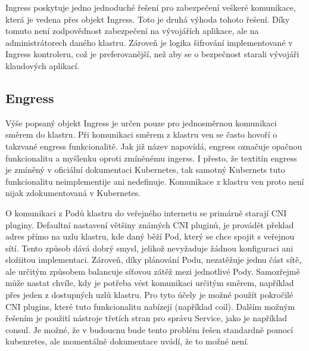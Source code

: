 Ingress poskytuje jedno jednoduché řešení pro zabezpečení veškeré komunikace, která je vedena přes objekt Ingress. Toto je druhá výhoda tohoto řešení. Díky tomuto není zodpovědnost zabezpečení na vývojářích aplikace, ale na administrátorech daného klastru. Zároveň je logika šifrování implementované v Ingress kontroleru, což je preferovanější, než aby se o bezpečnost starali vývojáři klaudových aplikací.\cite{koke_2023_bezpen}

\subsection{Engress}
Výše popsaný objekt Ingress je určen pouze pro jednosměrnou komunikaci směrem do klastru. Při komunikaci směrem z klastru ven se často hovoří o takzvané engress funkcionalitě. Jak již název napovídá, engress označuje opačnou funkcionalitu a myšlenku oproti zmíněnému ingerss. I přesto, že textitín engress je zmíněný v oficiální dokumentaci Kubernetes, tak samotný Kubernets tuto funkcionalitu neimplementije ani nedefinuje. Komunikace z klastru ven proto není nijak zdokumentovaná v Kubernetes.

O komunikaci z Podů klastru do veřejného internetu se primárně starají CNI pluginy. Defaultní nastavení většiny známých CNI pluginů, je provádět překlad adres přímo na uzlu klastru, kde daný běží Pod, který se chce spojit s veřejnou sítí. Tento způsob dává dobrý smysl, jelikož nevyžaduje žádnou konfiguraci ani složiitou implementaci. Zároveň, díky plánování Podu, nezatěžuje jednu část sítě, ale určitým způsobem balancuje síťovou zátěž mezi jednotlivé Pody. Samozřejmě může nastat chvíle, kdy je potřeba vést komunikaci určitým směrem, například přes jeden z dostupných uzlů klastru. Pro tyto účely je možné použít pokročilé CNI plugins, které tuto funkcionalitu nabízejí (například coil)\cite{yamamoto_2020_introducing}. Dalším možným řešením je použití nástroje třetích stran pro správu Service, jako je například consul. Je možné, že v budoucnu bude tento problém řešen standardně pomocí kubenretes, ale momentálně dokumentace uvádí, že to možné není.\cite{thekubernetesauthors_2022_network}




